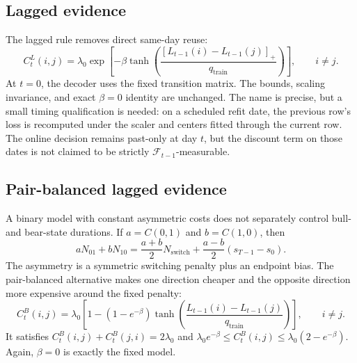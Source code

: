\subsection{Lagged evidence}

The lagged rule removes direct same-day reuse:
\begin{equation}
C_t^{L}(i,j)=\lambda_0\exp\left[
-\beta\tanh\left(
\frac{[L_{t-1}(i)-L_{t-1}(j)]_+}{q_{\mathrm{train}}}
\right)\right],
\qquad i\neq j.
\label{eq:lagged}
\end{equation}
At $t=0$, the decoder uses the fixed transition matrix. The bounds, scaling
invariance, and exact $\beta=0$ identity are unchanged. The name is precise, but
a small timing qualification is needed: on a scheduled refit date, the previous
row's loss is recomputed under the scaler and centers fitted through the current
row. The online decision remains past-only at day $t$, but the discount term on
those dates is not claimed to be strictly $\mathcal{F}_{t-1}$-measurable.

\subsection{Pair-balanced lagged evidence}

A binary model with constant asymmetric costs does not separately control bull-
and bear-state durations. If $a=C(0,1)$ and $b=C(1,0)$, then
\begin{equation}
aN_{01}+bN_{10}
=\frac{a+b}{2}N_{\mathrm{switch}}
+\frac{a-b}{2}(s_{T-1}-s_0).
\label{eq:directedidentity}
\end{equation}
The asymmetry is a symmetric switching penalty plus an endpoint bias. The
pair-balanced alternative makes one direction cheaper and the opposite direction
more expensive around the fixed penalty:
\begin{equation}
C_t^{B}(i,j)=\lambda_0\left[
1-(1-e^{-\beta})
\tanh\left(
\frac{L_{t-1}(i)-L_{t-1}(j)}{q_{\mathrm{train}}}
\right)\right],
\qquad i\neq j.
\label{eq:balanced}
\end{equation}
It satisfies $C_t^{B}(i,j)+C_t^{B}(j,i)=2\lambda_0$ and
$\lambda_0e^{-\beta}\leq C_t^{B}(i,j)\leq\lambda_0(2-e^{-\beta})$. Again,
$\beta=0$ is exactly the fixed model.

